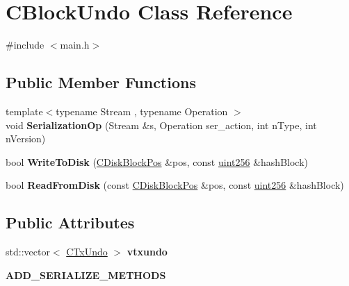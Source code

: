 \hypertarget{class_c_block_undo}{}\section{C\+Block\+Undo Class Reference}
\label{class_c_block_undo}


{\ttfamily \#include $<$main.\+h$>$}

\subsection*{Public Member Functions}
\begin{DoxyCompactItemize}
\item 
\mbox{\label{class_c_block_undo_ad4d50e2b34e291dbe2d15fbe3ae3670b}} 
{\footnotesize template$<$typename Stream , typename Operation $>$ }\\void {\bfseries Serialization\+Op} (Stream \&s, Operation ser\+\_\+action, int n\+Type, int n\+Version)
\item 
\mbox{\label{class_c_block_undo_a5411380452c33aeb6ccccbdf6ffda066}} 
bool {\bfseries Write\+To\+Disk} (\mbox{\hyperlink{struct_c_disk_block_pos}{C\+Disk\+Block\+Pos}} \&pos, const \mbox{\hyperlink{classuint256}{uint256}} \&hash\+Block)
\item 
\mbox{\label{class_c_block_undo_a9b3d67fdd3a2b88dbbd543bf530ee924}} 
bool {\bfseries Read\+From\+Disk} (const \mbox{\hyperlink{struct_c_disk_block_pos}{C\+Disk\+Block\+Pos}} \&pos, const \mbox{\hyperlink{classuint256}{uint256}} \&hash\+Block)
\end{DoxyCompactItemize}
\subsection*{Public Attributes}
\begin{DoxyCompactItemize}
\item 
\mbox{\label{class_c_block_undo_ad0baf7a4d3634b27b4affac2e7cf75c9}} 
std\+::vector$<$ \mbox{\hyperlink{class_c_tx_undo}{C\+Tx\+Undo}} $>$ {\bfseries vtxundo}
\item 
\mbox{\label{class_c_block_undo_a4fecc9723902f51e25b57e2e2d45334a}} 
{\bfseries A\+D\+D\+\_\+\+S\+E\+R\+I\+A\+L\+I\+Z\+E\+\_\+\+M\+E\+T\+H\+O\+DS}
\end{DoxyCompactItemize}


